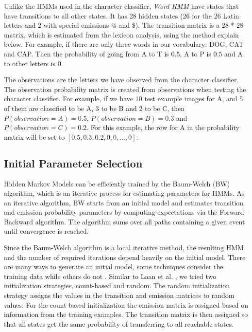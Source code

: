 Unlike the HMMs used in the character classifier, \textit{Word HMM} have states that have transitions to all other states.
It has 28 hidden states (26 for the 26 Latin letters and 2 with special emissions @ and \$). 
The transition matrix is a 28 * 28 matrix, which is estimated from the lexicon analysis, using the method explain below.
For example, if there are only three words in our vocabulary: DOG, CAT and CAP.
Then the probability of going from A to T is $0.5$, A to P is $0.5$ and A to other letters is $0$.

The observations are the letters we have observed from the character classifier.
The observation probability matrix is created from observations when testing the character classifier.
For example, if we have 10 test example images for A, and 5 of them are classified to be A, 3 to be B and 2 to be C, then $P(observation=A)=0.5$, $P(observation=B)=0.3$ and $P(observation=C)=0.2$.
For this example, the row for A in the probability matrix will be set to $[0.5, 0.3, 0.2, 0, 0,...,0]$.

\subsection{Initial Parameter Selection}

Hidden Markov Models can be efficiently trained by the Baum-Welch (BW) algorithm, which is an iterative process for estimating parameters for HMMs. 
As an iterative algorithm, BW starts from an initial model and estimates transition and emission probability parameters by computing expectations via the Forward-Backward algorithm.
The algorithm sums over all paths containing a given event until convergence is reached.

Since the Baum-Welch algorithm is a local iterative method, the resulting HMM and the number of required iterations depend heavily on the initial model. 
There are many ways to generate an initial model, some techniques consider the training data while others do not \cite{Laan}.
Similar to Laan et al. \cite{Laan}, we tried two initialization strategies, count-based and random.
The random initialization strategy assigns the values in the transition and emission matrices to random values.
For the count-based initialization the emission matrix is assigned based on information from the training examples. The transition matrix is then assigned so that all states get the same probability of transferring to all reachable states.

